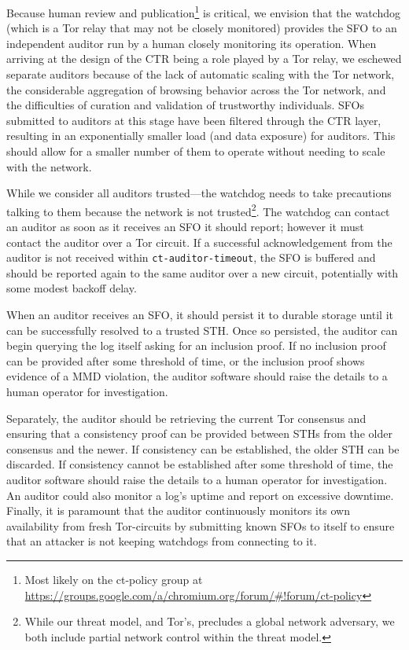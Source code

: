 Because human review and publication\footnote{Most likely on the ct-policy group
at \url{https://groups.google.com/a/chromium.org/forum/\#!forum/ct-policy}} is
critical, we envision that the watchdog (which is a Tor relay that may not be
closely monitored) provides the SFO to an independent auditor run by a human
closely monitoring its operation. When arriving at the design of the CTR being a
role played by a Tor relay, we eschewed separate auditors because of the lack of
automatic scaling with the Tor network, the considerable aggregation of browsing
behavior across the Tor network, and the difficulties of curation and validation
of trustworthy individuals. SFOs submitted to auditors at this stage have been
filtered through the CTR layer, resulting in an exponentially smaller load (and
data exposure) for auditors. This should allow for a smaller number of them to
operate without needing to scale with the network.

While we consider all auditors trusted---the watchdog needs to take precautions
talking to them because the network is not trusted\footnote{While our threat
model, and Tor's, precludes a global network adversary, we both include partial
network control within the threat model.}.  The watchdog can contact an auditor
as soon as it receives an SFO it should report; however it must contact the
auditor over a Tor circuit. If a successful acknowledgement from the auditor is
not received within \texttt{ct-auditor-timeout}, the SFO is buffered and should
be reported again to the same auditor over a new circuit, potentially with some
modest backoff delay.

When an auditor receives an SFO, it should persist it to durable storage until
it can be successfully resolved to a trusted STH\@. Once so persisted, the
auditor can begin querying the log itself asking for an inclusion proof. If no
inclusion proof can be provided after some threshold of time, or the inclusion
proof shows evidence of a MMD violation, the auditor software should raise the
details to a human operator for investigation.

Separately, the auditor should be retrieving the current Tor consensus and
ensuring that a consistency proof can be provided between STHs from the older
consensus and the newer. If consistency can be established, the older STH can be
discarded. If consistency cannot be established after some threshold of time,
the auditor software should raise the details to a human operator for
investigation. An auditor could also monitor a log's uptime and report on
excessive downtime. Finally, it is paramount that the auditor continuously
monitors its own availability from fresh Tor-circuits by submitting known SFOs
to itself to ensure that an attacker is not keeping watchdogs from connecting to
it.

